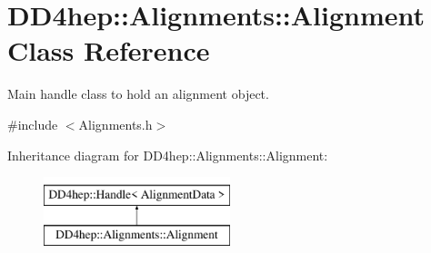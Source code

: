 \hypertarget{class_d_d4hep_1_1_alignments_1_1_alignment}{}\section{D\+D4hep\+:\+:Alignments\+:\+:Alignment Class Reference}
\label{class_d_d4hep_1_1_alignments_1_1_alignment}


Main handle class to hold an alignment object.  




{\ttfamily \#include $<$Alignments.\+h$>$}

Inheritance diagram for D\+D4hep\+:\+:Alignments\+:\+:Alignment\+:\begin{figure}[H]
\begin{center}
\leavevmode
\includegraphics[height=2.000000cm]{class_d_d4hep_1_1_alignments_1_1_alignment}
\end{center}
\end{figure}
